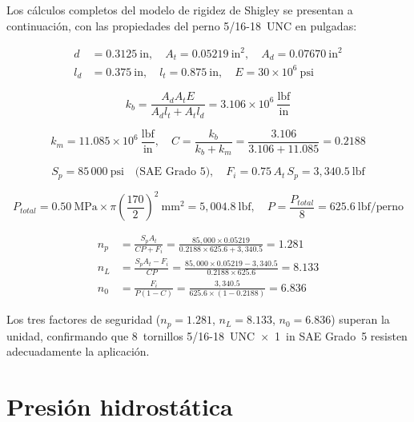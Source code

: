 Los c\'alculos completos del modelo de rigidez de Shigley se presentan a
continuaci\'on, con las propiedades del perno 5/16-18~UNC en pulgadas:

\begin{align}
d &= 0.3125\ \text{in}, \quad A_t = 0.05219\ \text{in}^2, \quad A_d = 0.07670\ \text{in}^2 \\
l_d &= 0.375\ \text{in}, \quad l_t = 0.875\ \text{in}, \quad E = 30{\times}10^6\ \text{psi}
\end{align}

\begin{equation}
k_b = \frac{A_d A_t E}{A_d l_t + A_t l_d} = 3.106 \times 10^6\ \frac{\text{lbf}}{\text{in}}
\end{equation}

\begin{equation}
k_m = 11.085 \times 10^6\ \frac{\text{lbf}}{\text{in}}, \quad
C = \frac{k_b}{k_b + k_m} = \frac{3.106}{3.106 + 11.085} = 0.2188
\end{equation}

\begin{equation}
S_p = 85\,000\ \text{psi} \quad \text{(SAE Grado~5)}, \quad
F_i = 0.75\, A_t\, S_p = 3{,}340.5\ \text{lbf}
\end{equation}

\begin{equation}
P_{total} = 0.50\ \text{MPa} \times \pi\left(\frac{170}{2}\right)^2\ \text{mm}^2
= 5{,}004.8\ \text{lbf}, \quad P = \frac{P_{total}}{8} = 625.6\ \text{lbf/perno}
\end{equation}

\begin{align}
n_p &= \frac{S_p A_t}{C P + F_i} = \frac{85{,}000 \times 0.05219}{0.2188 \times 625.6 + 3{,}340.5} = 1.281 \\
n_L &= \frac{S_p A_t - F_i}{C P} = \frac{85{,}000 \times 0.05219 - 3{,}340.5}{0.2188 \times 625.6} = 8.133 \\
n_0 &= \frac{F_i}{P(1-C)} = \frac{3{,}340.5}{625.6 \times (1 - 0.2188)} = 6.836
\end{align}

Los tres factores de seguridad ($n_p = 1.281$, $n_L = 8.133$, $n_0 = 6.836$)
superan la unidad, confirmando que 8~tornillos 5/16-18~UNC~$\times$~1\textonequarter~in
SAE Grado~5 resisten adecuadamente la aplicaci\'on.

\section*{Presión hidrostática}

